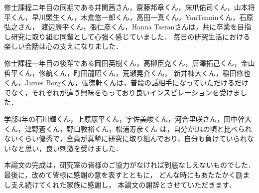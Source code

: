修士課程二年目の同期である井関茜さん，齋藤邦章くん，床爪佑司くん，山本将平くん，早川顕生くん，木倉悠一郎くん，高田一真くん，YanTenninくん，石原弘之さん，
渡辺康平くん，張仁彦くん，Hanna Tseranさんは，共に卒業を目指し研究に取り組む同輩として心強く感じていました．
毎日の研究生活における楽しい会話は心の支えになりました．

修士課程一年目の後輩である岡田英樹くん，高柳臣克くん，唐澤拓己くん，金山哲平くん，佟航くん，町田龍昭くん，荒瀬晃介くん，
新井棟大くん，稲田修也くん，James Borgくん，張徳軒くんは，普段の話相手になっていただけるだけでなく，それぞれが違う興味をもっており良いインスピレーションを受けました．

学部4年の石川輝くん，上原康平くん，宇佐美峻くん，河合里咲さん，田中幹大くん，津野蒼くん，野口敦裕くん，松浦寿彦くん
は，自分がB4の頃と比べられないくらい優秀で，全員が真摯に研究に取り組んでおり，自分も負けていられないなと思い，良い刺激を受けました．

本論文の完成は，研究室の皆様のご協力がなければ到底なしえないものでした．
最後に，改めて皆様に感謝の意を表すとともに，
どんな時にもあたたかく励まし支え続けてくれた家族に感謝し，
本論文の謝辞とさせていただきます．


